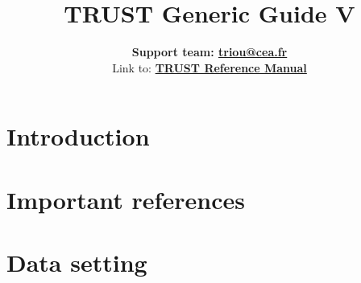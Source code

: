 \documentclass[a4paper,11pt,english]{report}
\def\TRUSTVERSION{}
\def\TRUSTVERSION{V\TRUSTV}
\def \REFERENCEMANUAL {TRUST_Reference_Manual.pdf}
\newcommand{\trust}{\textbf{TRUST}\xspace}
\begin{document}
\title{\vspace{2cm}\Huge \bfseries{TRUST Generic Guide \TRUSTVERSION}}
\author{
\vspace{2cm} %
\LARGE \textbf{Support team: \href{mailto:triou@cea.fr}{triou@cea.fr}} \\
\vspace{1cm} %
Link to: \LARGE \textbf{\href{run:\REFERENCEMANUAL}{\trust Reference Manual}}\\
}

\maketitle
\tableofcontents{}
\newpage


%
\chapter{Introduction}
%




%
\chapter{Important references}
%




%
\chapter{Data setting}
%

\end{document}
